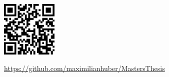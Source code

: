 \newpage\thispagestyle{empty}
\mbox{}\vfill
\begin{center}
  \includegraphics[width=0.2\textwidth]{qrCode.eps}
\end{center}
\begin{center}
  \url{https://github.com/maximilianhuber/MastersThesis}
\end{center}

